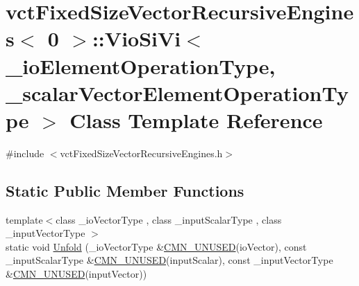 \hypertarget{classvct_fixed_size_vector_recursive_engines_3_010_01_4_1_1_vio_si_vi}{\section{vct\-Fixed\-Size\-Vector\-Recursive\-Engines$<$ 0 $>$\-:\-:Vio\-Si\-Vi$<$ \-\_\-io\-Element\-Operation\-Type, \-\_\-scalar\-Vector\-Element\-Operation\-Type $>$ Class Template Reference}
\label{classvct_fixed_size_vector_recursive_engines_3_010_01_4_1_1_vio_si_vi}
}


{\ttfamily \#include $<$vct\-Fixed\-Size\-Vector\-Recursive\-Engines.\-h$>$}

\subsection*{Static Public Member Functions}
\begin{DoxyCompactItemize}
\item 
{\footnotesize template$<$class \-\_\-io\-Vector\-Type , class \-\_\-input\-Scalar\-Type , class \-\_\-input\-Vector\-Type $>$ }\\static void \hyperlink{classvct_fixed_size_vector_recursive_engines_3_010_01_4_1_1_vio_si_vi_a59f751d60e4f1665c4de4bceeb939306}{Unfold} (\-\_\-io\-Vector\-Type \&\hyperlink{cmn_portability_8h_a021894e2626935fa2305434b1e893ff6}{C\-M\-N\-\_\-\-U\-N\-U\-S\-E\-D}(io\-Vector), const \-\_\-input\-Scalar\-Type \&\hyperlink{cmn_portability_8h_a021894e2626935fa2305434b1e893ff6}{C\-M\-N\-\_\-\-U\-N\-U\-S\-E\-D}(input\-Scalar), const \-\_\-input\-Vector\-Type \&\hyperlink{cmn_portability_8h_a021894e2626935fa2305434b1e893ff6}{C\-M\-N\-\_\-\-U\-N\-U\-S\-E\-D}(input\-Vector))
\end{DoxyCompactItemize}


